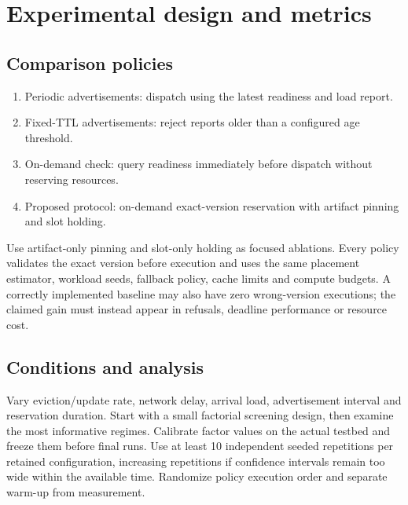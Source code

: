 \documentclass[11pt,a4paper]{article}
\begin{document}
\section{Experimental design and metrics}

\subsection{Comparison policies}

\begin{enumerate}
\item Periodic advertisements: dispatch using the latest readiness and load report.
\item Fixed-TTL advertisements: reject reports older than a configured age threshold.
\item On-demand check: query readiness immediately before dispatch without reserving resources.
\item Proposed protocol: on-demand exact-version reservation with artifact pinning and slot holding.
\end{enumerate}

Use artifact-only pinning and slot-only holding as focused ablations. Every policy validates the exact version before execution and uses the same placement estimator, workload seeds, fallback policy, cache limits and compute budgets. A correctly implemented baseline may also have zero wrong-version executions; the claimed gain must instead appear in refusals, deadline performance or resource cost.

\subsection{Conditions and analysis}

Vary eviction/update rate, network delay, arrival load, advertisement interval and reservation duration. Start with a small factorial screening design, then examine the most informative regimes. Calibrate factor values on the actual testbed and freeze them before final runs. Use at least 10 independent seeded repetitions per retained configuration, increasing repetitions if confidence intervals remain too wide within the available time. Randomize policy execution order and separate warm-up from measurement.
\end{document}
